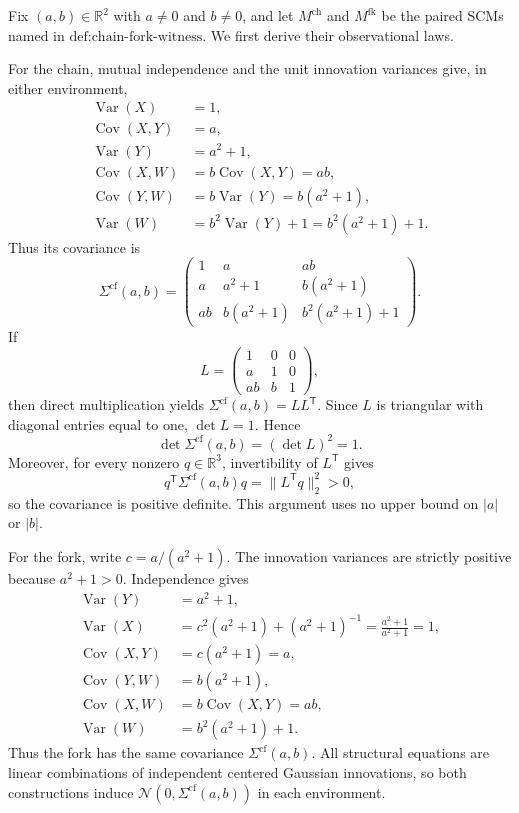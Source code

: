 Fix \((a,b)\in\mathbb R^2\) with \(a\neq0\) and \(b\neq0\), and let \(M^{\mathrm{ch}}\) and \(M^{\mathrm{fk}}\) be the paired SCMs named in \(\text{def:chain-fork-witness}\).  We first derive their observational laws.

For the chain, mutual independence and the unit innovation variances give, in either environment,
\[
\begin{aligned}
 \operatorname{Var}(X)&=1,\\
 \operatorname{Cov}(X,Y)&=a,\\
 \operatorname{Var}(Y)&=a^2+1,\\
 \operatorname{Cov}(X,W)&=b\operatorname{Cov}(X,Y)=ab,\\
 \operatorname{Cov}(Y,W)&=b\operatorname{Var}(Y)=b(a^2+1),\\
 \operatorname{Var}(W)&=b^2\operatorname{Var}(Y)+1=b^2(a^2+1)+1.
\end{aligned}
\]
Thus its covariance is
\[
 \Sigma^{\mathrm{cf}}(a,b)=
 \begin{pmatrix}
  1&a&ab\\
  a&a^2+1&b(a^2+1)\\
  ab&b(a^2+1)&b^2(a^2+1)+1
 \end{pmatrix}.
\]
If
\[
 L=\begin{pmatrix}1&0&0\\a&1&0\\ab&b&1\end{pmatrix},
\]
then direct multiplication yields \(\Sigma^{\mathrm{cf}}(a,b)=LL^{\mathsf T}\).  Since \(L\) is triangular with diagonal entries equal to one, \(\det L=1\).  Hence
\[
 \det\Sigma^{\mathrm{cf}}(a,b)=(\det L)^2=1.
\]
Moreover, for every nonzero \(q\in\mathbb R^3\), invertibility of \(L^{\mathsf T}\) gives
\[
 q^{\mathsf T}\Sigma^{\mathrm{cf}}(a,b)q
 =\|L^{\mathsf T}q\|_2^2>0,
\]
so the covariance is positive definite.  This argument uses no upper bound on \(|a|\) or \(|b|\).

For the fork, write \(c=a/(a^2+1)\).  The innovation variances are strictly positive because \(a^2+1>0\).  Independence gives
\[
\begin{aligned}
 \operatorname{Var}(Y)&=a^2+1,\\
 \operatorname{Var}(X)&=c^2(a^2+1)+(a^2+1)^{-1}
 =\frac{a^2+1}{a^2+1}=1,\\
 \operatorname{Cov}(X,Y)&=c(a^2+1)=a,\\
 \operatorname{Cov}(Y,W)&=b(a^2+1),\\
 \operatorname{Cov}(X,W)&=b\operatorname{Cov}(X,Y)=ab,\\
 \operatorname{Var}(W)&=b^2(a^2+1)+1.
\end{aligned}
\]
Thus the fork has the same covariance \(\Sigma^{\mathrm{cf}}(a,b)\).  All structural equations are linear combinations of independent centered Gaussian innovations, so both constructions induce \(\mathcal N(0,\Sigma^{\mathrm{cf}}(a,b))\) in each environment.

